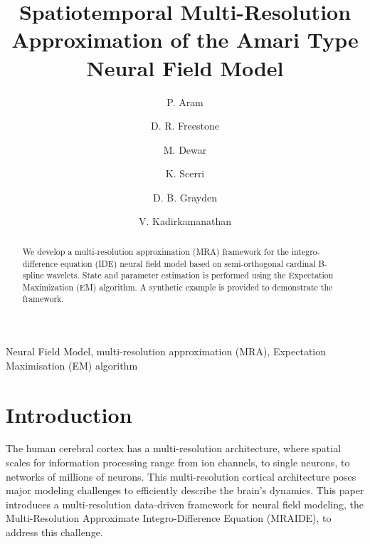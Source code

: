 \documentclass[review,authoryear,3p]{elsarticle}
\begin{document}
\begin{frontmatter}
\title{Spatiotemporal Multi-Resolution Approximation of the Amari Type Neural Field Model}
  
\author[US]{P. Aram}
\author[DEEE,BEI,UE]{D. R. Freestone}
\author[UE,CU]{M. Dewar}
\author[UM]{K. Scerri}
\author[DEEE,BEI]{D. B. Grayden}
\author[US]{V. Kadirkamanathan}

\address[US]{Department of Automatic Control and Systems Engineering, University of Sheffield, Sheffield, UK}
\address[DEEE]{Department of Electrical and Electronic Engineering, University of Melbourne, Melbourne, VIC, Australia}
\address[BEI]{The Bionic Ear Institute, East Melbourne, VIC, Australia}
\address[UE]{Institute for Adaptive and Neural Computation, University of Edinburgh, Edinburgh, UK}
\address[CU]{Department of Applied Physics and Applied Mathematics, Columbia University, New York, NY, USA}
\address[UM]{Department of Systems and Control Engineering, University of Malta, Msida, MSD, Malta}


\begin{abstract}
We develop a multi-resolution approximation (MRA) framework for the integro-difference equation (IDE) neural field model based on semi-orthogonal cardinal B-spline wavelets. State and parameter estimation is performed using the Expectation Maximization (EM) algorithm. A synthetic example is provided
to demonstrate the framework.
\end{abstract} 
\begin{keyword}
  Neural Field Model, multi-resolution approximation (MRA), Expectation Maximisation (EM) algorithm
\end{keyword}

\end{frontmatter}


\section{Introduction}
The human cerebral cortex has a multi-resolution architecture, where spatial scales for information processing range from ion channels, to single neurons, to networks of millions of neurons. This multi-resolution cortical architecture poses major modeling challenges to efficiently describe the brain's dynamics. This paper introduces a multi-resolution data-driven framework for neural field modeling, the Multi-Resolution Approximate Integro-Difference Equation (MRAIDE), to address this challenge. 
\end{document}
